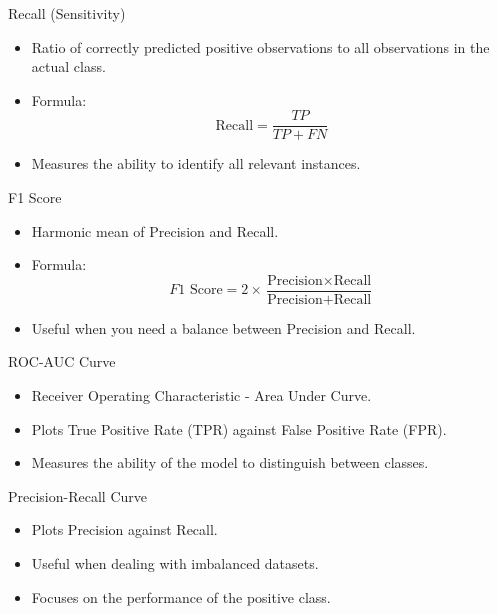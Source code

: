\begin{frame}{Recall (Sensitivity)}
    \begin{itemize}
        \item Ratio of correctly predicted positive observations to all observations in the actual class.
        \item Formula:
        \[
        \text{Recall} = \frac{TP}{TP + FN}
        \]
        \item Measures the ability to identify all relevant instances.
    \end{itemize}
\end{frame}

\begin{frame}{F1 Score}
    \begin{itemize}
        \item Harmonic mean of Precision and Recall.
        \item Formula:
        \[
        F1 \text{ Score} = 2 \times \frac{\text{Precision} \times \text{Recall}}{\text{Precision} + \text{Recall}}
        \]
        \item Useful when you need a balance between Precision and Recall.
    \end{itemize}
\end{frame}


\begin{frame}{ROC-AUC Curve}
    \begin{itemize}
        \item Receiver Operating Characteristic - Area Under Curve.
        \item Plots True Positive Rate (TPR) against False Positive Rate (FPR).
        \item Measures the ability of the model to distinguish between classes.
    \end{itemize}
\end{frame}

\begin{frame}{Precision-Recall Curve}
    \begin{itemize}
        \item Plots Precision against Recall.
        \item Useful when dealing with imbalanced datasets.
        \item Focuses on the performance of the positive class.
    \end{itemize}
\end{frame}
